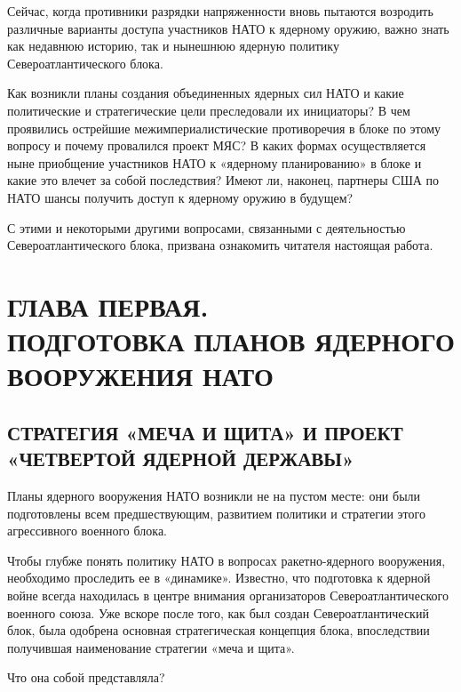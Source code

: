 \documentclass[12pt, a4paper, openany]{book}
\begin{document}
Сейчас, когда противники разрядки напряженности вновь пытаются возродить различные варианты доступа участников НАТО к ядерному оружию, важно знать как недавнюю историю, так и нынешнюю ядерную политику Североатлантического блока.

Как возникли планы создания объединенных ядерных сил НАТО и какие политические и стратегические цели преследовали их инициаторы? В чем проявились острейшие межимпериалистические противоречия в блоке по этому вопросу и почему провалился проект МЯС? В каких формах осуществляется ныне приобщение участников НАТО к «ядерному планированию» в блоке и какие это влечет за собой последствия? Имеют ли, наконец, партнеры США по НАТО шансы получить доступ к ядерному оружию в будущем?

С этими и некоторыми другими вопросами, связанными с деятельностью Североатлантического блока, призвана ознакомить читателя настоящая работа.
	\newpage
	
	\section[Глава первая. ПОДГОТОВКА ПЛАНОВ ЯДЕРНОГО ВООРУЖЕНИЯ НАТО]{\center ГЛАВА ПЕРВАЯ.\\ \textbf{ПОДГОТОВКА ПЛАНОВ ЯДЕРНОГО ВООРУЖЕНИЯ НАТО}}	
	\subsection[Стратегия «меча и щита» и проект «четвертой ядерной державы»]{\center СТРАТЕГИЯ «МЕЧА И ЩИТА» И ПРОЕКТ «ЧЕТВЕРТОЙ ЯДЕРНОЙ ДЕРЖАВЫ»}

Планы ядерного вооружения НАТО возникли не на пустом месте: они были подготовлены всем предшествующим, развитием политики и стратегии этого агрессивного военного блока.
	
Чтобы глубже понять политику НАТО в вопросах ракетно-ядерного вооружения, необходимо проследить ее в «динамике». Известно, что подготовка к ядерной войне всегда находилась в центре внимания организаторов Североатлантического военного союза. Уже вскоре после того, как был создан Североатлантический блок, была одобрена основная стратегическая концепция блока, впоследствии получившая наименование стратегии «меча и щита».
	
Что она собой представляла?
	
\end{document}
